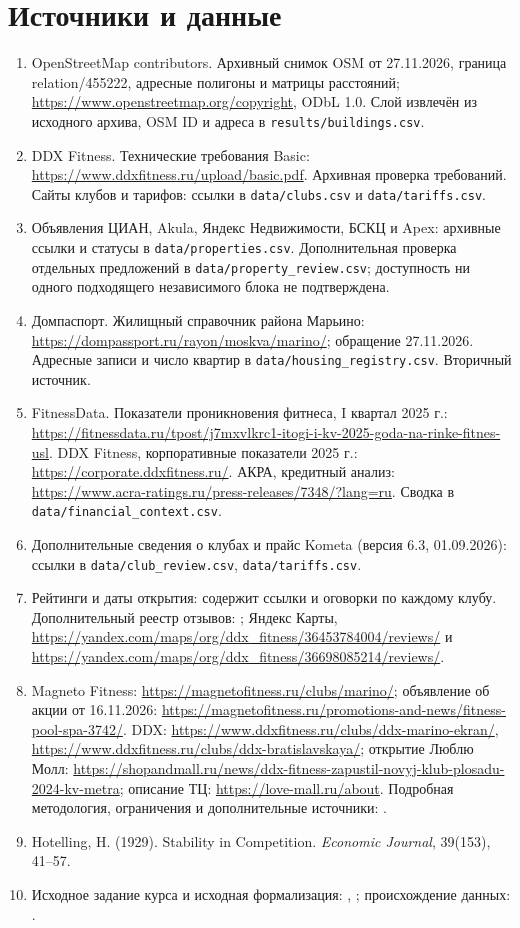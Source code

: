 \documentclass[12pt,a4paper]{article}
\begin{document}
\section*{Источники и данные}
\small
{}
\begin{enumerate}
\item OpenStreetMap contributors. Архивный снимок OSM от 27.11.2026, граница relation/455222, адресные полигоны и матрицы расстояний; \url{https://www.openstreetmap.org/copyright}, ODbL 1.0. Слой  извлечён из исходного архива, OSM ID и адреса в \texttt{results/buildings.csv}.
\item DDX Fitness. Технические требования Basic: \url{https://www.ddxfitness.ru/upload/basic.pdf}. Архивная проверка требований. Сайты клубов и тарифов: ссылки в \texttt{data/clubs.csv} и \texttt{data/tariffs.csv}.
\item Объявления ЦИАН, Akula, Яндекс Недвижимости, БСКЦ и Apex: архивные ссылки и статусы в \texttt{data/properties.csv}. Дополнительная проверка отдельных предложений в \texttt{data/property\_review.csv}; доступность ни одного подходящего независимого блока не подтверждена.
\item Домпаспорт. Жилищный справочник района Марьино: \url{https://dompassport.ru/rayon/moskva/marino/}; обращение 27.11.2026. Адресные записи и число квартир в \texttt{data/housing\_registry.csv}. Вторичный источник.
\item FitnessData. Показатели проникновения фитнеса, I квартал 2025 г.: \url{https://fitnessdata.ru/tpost/j7mxvlkrc1-itogi-i-kv-2025-goda-na-rinke-fitnes-usl}. DDX Fitness, корпоративные показатели 2025 г.: \url{https://corporate.ddxfitness.ru/}. АКРА, кредитный анализ: \url{https://www.acra-ratings.ru/press-releases/7348/?lang=ru}. Сводка в \texttt{data/financial\_context.csv}.
\item Дополнительные сведения о клубах и прайс Kometa (версия 6.3, 01.09.2026): ссылки в \texttt{data/club\_review.csv}, \texttt{data/tariffs.csv}.
\item Рейтинги и даты открытия:  содержит ссылки и оговорки по каждому клубу. Дополнительный реестр отзывов: ; Яндекс Карты, \url{https://yandex.com/maps/org/ddx_fitness/36453784004/reviews/} и \url{https://yandex.com/maps/org/ddx_fitness/36698085214/reviews/}.
\item Magneto Fitness: \url{https://magnetofitness.ru/clubs/marino/}; объявление об акции от 16.11.2026: \url{https://magnetofitness.ru/promotions-and-news/fitness-pool-spa-3742/}. DDX: \url{https://www.ddxfitness.ru/clubs/ddx-marino-ekran/}, \url{https://www.ddxfitness.ru/clubs/ddx-bratislavskaya/}; открытие Люблю Молл: \url{https://shopandmall.ru/news/ddx-fitness-zapustil-novyj-klub-plosadu-2024-kv-metra}; описание ТЦ: \url{https://love-mall.ru/about}. Подробная методология, ограничения и дополнительные источники: .
\item Hotelling, H. (1929). Stability in Competition. \textit{Economic Journal}, 39(153), 41--57.
\item Исходное задание курса и исходная формализация: , ; происхождение данных: .
\end{enumerate}
\end{document}
